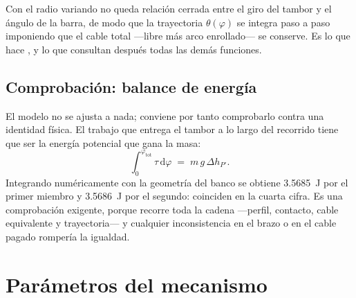 Con el radio variando no queda relación cerrada entre el giro del tambor y el ángulo de la barra, de
modo que la trayectoria $\theta(\varphi)$ se integra paso a paso imponiendo que el cable total
---libre más arco enrollado--- se conserve. Es lo que hace , y lo que
consultan después todas las demás funciones.

\subsection{Comprobación: balance de energía}

El modelo no se ajusta a nada; conviene por tanto comprobarlo contra una identidad física. El
trabajo que entrega el tambor a lo largo del recorrido tiene que ser la energía potencial que gana
la masa:
\begin{equation}
  \int_0^{\varphi_{\text{tot}}} \tau\,\mathrm{d}\varphi \;=\; m\,g\,\Delta h_{P'} .
  \label{eq:energia}
\end{equation}
Integrando numéricamente con la geometría del banco se obtiene \SI{3.5685}{\joule} por el primer
miembro y \SI{3.5686}{\joule} por el segundo: coinciden en la cuarta cifra. Es una comprobación
exigente, porque recorre toda la cadena ---perfil, contacto, cable equivalente y trayectoria--- y
cualquier inconsistencia en el brazo o en el cable pagado rompería la igualdad.

\section{Parámetros del mecanismo}

